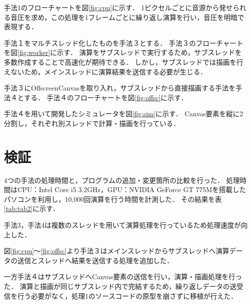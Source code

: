 \documentclass[twocolumn,10pt,a4j]{jsarticle}
\begin{document}
手法1のフローチャートを図\ref{fig:cpu}に示す．
1ピクセルごとに音源から発せられる音圧を求め，この処理を1フレームごとに繰り返し演算を行い，音圧を明暗で表現する．

手法１をマルチスレッド化したものを手法３とする．
手法３のフローチャートを図\ref{fig:worker}に示す．
演算をサブスレッドで実行するため，サブスレッドを多数作成することで高速化が期待できる．
しかし，サブスレッドでは描画を行えないため，メインスレッドに演算結果を送信する必要が生じる．

手法３にOffscreenCanvasを取り入れ，サブスレッドから直接描画する手法を手法４とする．
手法４のフローチャートを図\ref{fig:offsc}に示す．


手法４を用いて開発したシミュレータを図\ref{fig:sim}に示す．
Canvas要素を縦に2分割し，それぞれ別スレッドで計算・描画を行っている．

%
%


\section{検証}
4つの手法の処理時間と，プログラムの追加・変更箇所の比較を行った．
処理時間はCPU：Intel Core i5 3.2GHz，GPU：NVIDIA GeForce GT 775Mを搭載したパソコンを利用し，10,000回演算を行う時間を計測した．
その結果を表\ref{tab:tab2}に示す．

手法3，手法4は複数のスレッドを用いて演算処理を行っているため処理速度が向上した．

%
図\ref{fig:cpu}〜\ref{fig:offsc}より手法３はメインスレッドからサブスレッドへ演算データの送信とスレッドへ結果を送信する処理を追加した．

一方手法４はサブスレッドへCanvas要素の送信を行い，演算・描画処理を行った．
演算と描画が同じサブスレッド内で完結するため，繰り返しデータの送受信を行う必要がなく，処理1のソースコードの原型を崩さずに移植が行えた．
\end{document}
